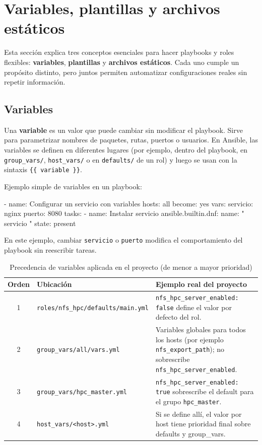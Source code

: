 \section{Variables, plantillas y archivos estáticos}
\label{sec:ansible_vars_templates_files}

Esta sección explica tres conceptos esenciales para hacer playbooks y roles flexibles: \textbf{variables}, \textbf{plantillas} y \textbf{archivos estáticos}. Cada uno cumple un propósito distinto, pero juntos permiten automatizar configuraciones reales sin repetir información.

\subsection{Variables}
\label{subsec:ansible_variables_intro}

Una \textbf{variable} es un valor que puede cambiar sin modificar el playbook. Sirve para parametrizar nombres de paquetes, rutas, puertos o usuarios. En Ansible, las variables se definen en diferentes lugares (por ejemplo, dentro del playbook, en \texttt{group\_vars/}, \texttt{host\_vars/} o en \texttt{defaults/} de un rol) y luego se usan con la sintaxis \texttt{\{\{ variable \}\}}. \cite{ansible_variables}

Ejemplo simple de variables en un playbook:
\begin{yamlcode}
- name: Configurar un servicio con variables
  hosts: all
  become: yes
  vars:
    servicio: nginx
    puerto: 8080
  tasks:
    - name: Instalar servicio
      ansible.builtin.dnf:
        name: "{{ servicio }}"
        state: present
\end{yamlcode}

En este ejemplo, cambiar \texttt{servicio} o \texttt{puerto} modifica el comportamiento del playbook sin reescribir tareas.

\begin{table}[H]
\centering
\small
\caption{Precedencia de variables aplicada en el proyecto (de menor a mayor prioridad)}
\label{tab:ansible_precedencia_aplicada}
\begin{tabular}{|c|>{\raggedright\arraybackslash}p{}|>{\raggedright\arraybackslash}p{}|}
\hline
\textbf{Orden} & \textbf{Ubicación} & \textbf{Ejemplo real del proyecto} \\
\hline
1 & \texttt{roles/nfs\_hpc/defaults/main.yml} & \texttt{nfs\_hpc\_server\_enabled: false} define el valor por defecto del rol. \\
\hline
2 & \texttt{group\_vars/all/vars.yml} & Variables globales para todos los hosts (por ejemplo \texttt{nfs\_export\_path}); no sobrescribe \texttt{nfs\_hpc\_server\_enabled}. \\
\hline
3 & \texttt{group\_vars/hpc\_master.yml} & \texttt{nfs\_hpc\_server\_enabled: true} sobrescribe el default para el grupo \texttt{hpc\_master}. \\
\hline
4 & \texttt{host\_vars/<host>.yml} & Si se define allí, el valor por host tiene prioridad final sobre defaults y group\_vars. \\
\hline
\end{tabular}
\end{table}

